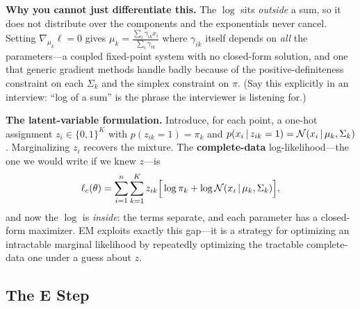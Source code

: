 \textbf{Why you cannot just differentiate this.} The $\log$ sits \emph{outside} a sum, so it does not distribute over the components and the exponentials never cancel. Setting $\nabla_{\mu_k} \ell = 0$ gives $\mu_k = \frac{\sum_i \gamma_{ik} x_i}{\sum_i \gamma_{ik}}$ where $\gamma_{ik}$ itself depends on \emph{all} the parameters---a coupled fixed-point system with no closed-form solution, and one that generic gradient methods handle badly because of the positive-definiteness constraint on each $\Sigma_k$ and the simplex constraint on $\pi$. (Say this explicitly in an interview: ``log of a sum'' is the phrase the interviewer is listening for.)

\textbf{The latent-variable formulation.} Introduce, for each point, a one-hot assignment $z_i \in \{0,1\}^K$ with $p(z_{ik} = 1) = \pi_k$ and $p(x_i \,|\, z_{ik} = 1) = \mathcal{N}(x_i \,|\, \mu_k, \Sigma_k)$. Marginalizing $z_i$ recovers the mixture. The \textbf{complete-data} log-likelihood---the one we would write if we knew $z$---is
\begin{equation}
\ell_c(\theta) = \sum_{i=1}^n \sum_{k=1}^K z_{ik}\Big[\log \pi_k + \log \mathcal{N}(x_i \,|\, \mu_k, \Sigma_k)\Big],
\label{eq:cml:complete_ll}
\end{equation}
and now the $\log$ is \emph{inside}: the terms separate, and each parameter has a closed-form maximizer. EM exploits exactly this gap---it is a strategy for optimizing an intractable marginal likelihood by repeatedly optimizing the tractable complete-data one under a guess about $z$.

\subsection{The E Step}


